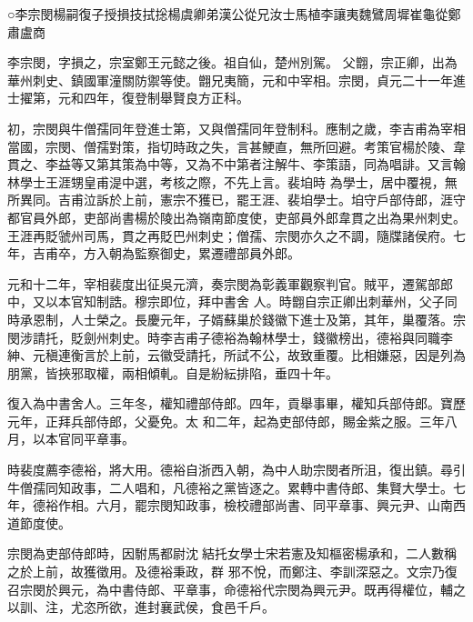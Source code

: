 
\begin{pinyinscope}

 ○李宗閔楊嗣復子授損技拭捴楊虞卿弟漢公從兄汝士馬植李讓夷魏鷿周墀崔龜從鄭肅盧商



 李宗閔，字損之，宗室鄭王元懿之後。祖自仙，楚州別駕。
 父䎖，宗正卿，出為華州刺史、鎮國軍潼關防禦等使。䎖兄夷簡，元和中宰相。宗閔，貞元二十一年進士擢第，元和四年，復登制舉賢良方正科。



 初，宗閔與牛僧孺同年登進士第，又與僧孺同年登制科。應制之歲，李吉甫為宰相當國，宗閔、僧孺對策，指切時政之失，言甚鯁直，無所回避。考策官楊於陵、韋貫之、李益等又第其策為中等，又為不中第者注解牛、李策語，同為唱誹。又言翰林學士王涯甥皇甫湜中選，考核之際，不先上言。裴垍時
 為學士，居中覆視，無所異同。吉甫泣訴於上前，憲宗不獲已，罷王涯、裴垍學士。垍守戶部侍郎，涯守都官員外郎，吏部尚書楊於陵出為嶺南節度使，吏部員外郎韋貫之出為果州刺史。王涯再貶虢州司馬，貫之再貶巴州刺史；僧孺、宗閔亦久之不調，隨牒諸侯府。七年，吉甫卒，方入朝為監察御史，累遷禮部員外郎。



 元和十二年，宰相裴度出征吳元濟，奏宗閔為彰義軍觀察判官。賊平，遷駕部郎中，又以本官知制誥。穆宗即位，拜中書舍
 人。時䎖自宗正卿出刺華州，父子同時承恩制，人士榮之。長慶元年，子婿蘇巢於錢徽下進士及第，其年，巢覆落。宗閔涉請托，貶劍州刺史。時李吉甫子德裕為翰林學士，錢徽榜出，德裕與同職李紳、元稹連衡言於上前，云徽受請托，所試不公，故致重覆。比相嫌惡，因是列為朋黨，皆挾邪取權，兩相傾軋。自是紛紜排陷，垂四十年。



 復入為中書舍人。三年冬，權知禮部侍郎。四年，貢舉事畢，權知兵部侍郎。寶歷元年，正拜兵部侍郎，父憂免。太
 和二年，起為吏部侍郎，賜金紫之服。三年八月，以本官同平章事。



 時裴度薦李德裕，將大用。德裕自浙西入朝，為中人助宗閔者所沮，復出鎮。尋引牛僧孺同知政事，二人唱和，凡德裕之黨皆逐之。累轉中書侍郎、集賢大學士。七年，德裕作相。六月，罷宗閔知政事，檢校禮部尚書、同平章事、興元尹、山南西道節度使。



 宗閔為吏部侍郎時，因駙馬都尉沈結托女學士宋若憲及知樞密楊承和，二人數稱之於上前，故獲徵用。及德裕秉政，群
 邪不悅，而鄭注、李訓深惡之。文宗乃復召宗閔於興元，為中書侍郎、平章事，命德裕代宗閔為興元尹。既再得權位，輔之以訓、注，尤恣所欲，進封襄武侯，食邑千戶。




\end{pinyinscope}
